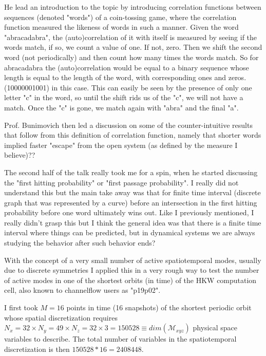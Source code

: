 \begin{description}
{\begin{description}
He lead an introduction to the topic by introducing correlation functions between sequences (denoted "words") of a coin-tossing
game, where the correlation function measured the likeness of words in such a manner. Given the word "abracadabra", the (auto)correlation
of it with itself is measured by seeing if the words match, if so, we count a value of one. If not, zero. Then we shift the second
word (not periodically) and then count how many times the words match. So for abracadabra the (auto)correlation would be equal to
a binary sequence whose length is equal to the length of the word, with corresponding ones and zeros. (10000001001) in this case.
This can easily be seen by the presence of only one letter "c" in the word, so until the shift rids us of the "c", we will not have
a match. Once the "c" is gone, we match again with "abra" and the final "a".

Prof. Bunimovich then led a discussion on some of the counter-intuitive results that follow from this definition of correlation
function, namely that shorter words implied faster "escape" from the open system (as defined by the measure I believe)??

The second half of the talk really took me for a spin, when he started discussing the "first hitting probability" or "first passage
probability". I really did not understand this but the main take away was that for finite time interval (discrete graph that was
represented by a curve) before an intersection in the first hitting probability before one word ultimately wins out. Like I previously
mentioned, I really didn't grasp this but I think the general idea was that there is a finite time interval where things can be predicted, but
in dynamical systems we are always studying the behavior after such behavior ends?


\item[Spatiotemporal Navier Stokes]
With the concept of a very small number of active spatiotemporal modes, usually due to discrete symmetries
I applied this in a very rough way to test the number of active modes in one of the shortest orbits (in time)
of the HKW computation cell, also known to channelflow users as "p19p02".

I first took $M=16$ points in time (16 snapshots) of the shortest periodic
orbit whose spatial discretization requires $N_x = 32 \times N_y = 49 \times N_z = 32 \times 3 = 150528 \equiv dim(\mathcal{M}_{xyz})$ physical
space variables to describe. The total number of variables in the spatiotemporal discretization is then $150528*16 = 2408448$.


\end{description}}
\end{description}
